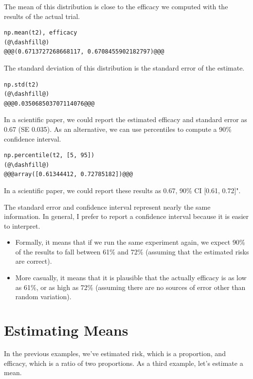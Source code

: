 The mean of this distribution is close to the efficacy we computed with
the results of the actual trial.

\begin{lstlisting}[]
np.mean(t2), efficacy
(@\dashfill@)
@@@(0.6713727268668117, 0.6708455902182797)@@@
\end{lstlisting}

The standard deviation of this distribution is the standard error of the
estimate.

\begin{lstlisting}[]
np.std(t2)
(@\dashfill@)
@@@0.035068503707114076@@@
\end{lstlisting}

In a scientific paper, we could report the estimated efficacy and
standard error as 0.67 (SE 0.035). As an alternative, we can use
percentiles to compute a 90\% confidence interval.

\begin{lstlisting}[]
np.percentile(t2, [5, 95])
(@\dashfill@)
@@@array([0.61344412, 0.72785182])@@@
\end{lstlisting}

In a scientific paper, we could report these results as 0.67, 90\% CI
{[}0.61, 0.72{]}".

The standard error and confidence interval represent nearly the same
information. In general, I prefer to report a confidence interval
because it is easier to interpret.

\begin{itemize}
\item
  Formally, it means that if we run the same experiment again, we expect
  90\% of the results to fall between 61\% and 72\% (assuming that the
  estimated risks are correct).
\item
  More casually, it means that it is plausible that the actually
  efficacy is as low as 61\%, or as high as 72\% (assuming there are no
  sources of error other than random variation).
\end{itemize}

\hypertarget{estimating-means}{%
\section{Estimating Means}\label{estimating-means}}

In the previous examples, we've estimated risk, which is a proportion,
and efficacy, which is a ratio of two proportions. As a third example,
let's estimate a mean.

